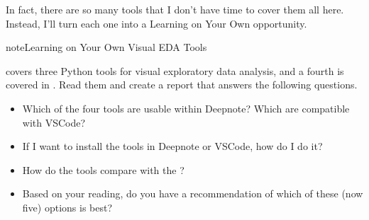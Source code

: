 \documentclass[letterpaper,10pt,english]{jupyterBook}
\begin{document}
\sphinxAtStartPar
In fact, there are so many tools that I don’t have time to cover them all here.  Instead, I’ll turn each one into a Learning on Your Own opportunity.

\begin{sphinxadmonition}{note}{Learning on Your Own \sphinxhyphen{} Visual EDA Tools}

\sphinxAtStartPar
{} covers three Python tools for visual exploratory data analysis, and a fourth is covered in .  Read them and create a report that answers the following questions.
\begin{itemize}
\item {} 
\sphinxAtStartPar
Which of the four tools are usable within Deepnote?  Which are compatible with VSCode?

\item {} 
\sphinxAtStartPar
If I want to install the tools in Deepnote or VSCode, how do I do it?

\item {} 
\sphinxAtStartPar
How do the tools compare with the ?

\item {} 
\sphinxAtStartPar
Based on your reading, do you have a recommendation of which of these (now five) options is best?

\end{itemize}
\end{sphinxadmonition}
\end{document}
